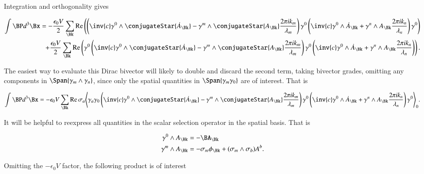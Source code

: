 Integration and orthogonality gives

\begin{align*}
\int \BP d^3 \Bx =
-\frac{\epsilon_0 V}{2} \sum_{\Bk} \Real \left(
\left( \inv{c} \gamma^0 \wedge \conjugateStar{\dot{A}_{\Bk}} - \gamma^m \wedge \conjugateStar{A_{\Bk}} \frac{2 \pi i k_m}{\lambda_m} \right) 
\gamma^0
\left( \inv{c} \gamma^0 \wedge \dot{A}_\Bk + \gamma^n \wedge A_\Bk \frac{2 \pi i k_n}{\lambda_n} \right) 
\gamma^0
\right) \\
+\frac{\epsilon_0 V}{2} \sum_{\Bk} \Real \left(
\gamma^0
\left( \inv{c} \gamma^0 \wedge \conjugateStar{\dot{A}_{\Bk}} - \gamma^m \wedge \conjugateStar{A_{\Bk}} \frac{2 \pi i k_m}{\lambda_m} \right) 
\gamma^0
\left( \inv{c} \gamma^0 \wedge \dot{A}_\Bk + \gamma^n \wedge A_\Bk \frac{2 \pi i k_n}{\lambda_n} \right) 
\right)
.
\end{align*}

The easiest way to evaluate this Dirac bivector will likely to double and discard the second term, taking bivector grades, omitting any components in $\Span\{\gamma_m \wedge \gamma_n\}$, since only the spatial quantities in $\Span\{\gamma_m \gamma_0\}$ are of interest.  That is

\begin{align}\label{eqn:fourierMaxVac:61}
\int \BP d^3 \Bx =
- \epsilon_0 V \sum_{\Bk} \Real \sigma_a 
\gpgradezero{
\gamma_a \gamma_0 
\left( \inv{c} \gamma^0 \wedge \conjugateStar{\dot{A}_{\Bk}} - \gamma^m \wedge \conjugateStar{A_{\Bk}} \frac{2 \pi i k_m}{\lambda_m} \right) 
\gamma^0
\left( \inv{c} \gamma^0 \wedge \dot{A}_\Bk + \gamma^n \wedge A_\Bk \frac{2 \pi i k_n}{\lambda_n} \right) 
\gamma^0
}
.
\end{align}

It will be helpful to reexpress all quantities in the scalar selection operator in the spatial basis.  That is

\begin{align}\label{eqn:fourierMaxVac:62}
\gamma^0 \wedge A_\Bk &= -\BA_\Bk  \\
\gamma^m \wedge A_\Bk &= -\sigma_m \phi_\Bk + (\sigma_m \wedge \sigma_b) A^b.
\end{align}

Omitting the $-\epsilon_0 V$ factor, the following product is of interest


